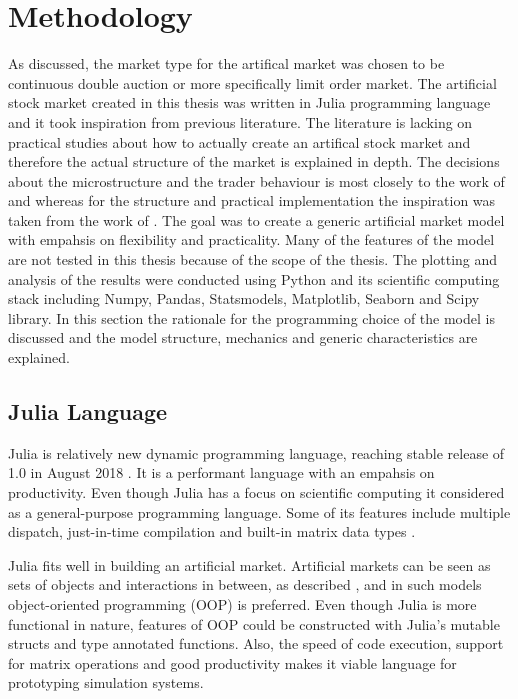 
\section{Methodology}

As discussed, the market type for the artifical market was chosen 
to be continuous double auction or more specifically limit order market.
The artificial stock market created in this thesis was written in Julia
programming language and it took inspiration from previous literature.
The literature is lacking on practical studies about how to actually create
an artifical stock market and therefore the actual structure of the market is explained
in depth. The decisions about the microstructure and the trader behaviour
is most closely to the work of \citet{Genoa01} and \citet{Raberto05}
whereas for the structure and practical implementation the inspiration
was taken from the work of \citet{Ben12}. The goal was to create a generic artificial market 
model with empahsis on flexibility and practicality. Many of the features
of the model are not tested in this thesis because of the scope of the thesis.
The plotting and analysis of the results were conducted using Python and its scientific
computing stack including Numpy, Pandas, Statsmodels, Matplotlib, Seaborn and Scipy library.
In this section the rationale for the programming choice of the model is discussed
and the model structure, mechanics and generic characteristics are 
explained.

\subsection{Julia Language}
Julia is relatively new dynamic programming language, 
reaching stable release of 1.0 in August 2018 \citep{JuliaV1}.
It is a performant language with an empahsis
on productivity. Even though Julia has a focus on scientific 
computing it considered as a general-purpose programming
language. Some of its features include
multiple dispatch, just-in-time compilation and built-in
matrix data types \citep{Julia}.

Julia fits well in building an artificial market.
Artificial markets can be seen as sets of objects
and interactions in between, as described \citet{Ben12},
and in such models object-oriented programming (OOP)
is preferred. Even though Julia is more functional in nature, 
features of OOP could be constructed with Julia's mutable structs 
and type annotated functions. Also, the speed of code execution, 
support for matrix operations and good productivity makes 
it viable language for prototyping simulation systems. 


